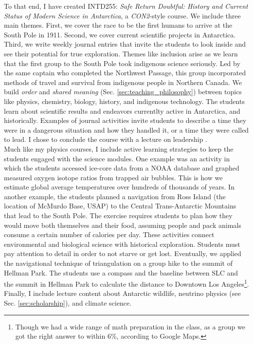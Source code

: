 \documentclass[../../../main.tex]{subfiles}
\begin{document}
To that end, I have created INTD255: \textit{Safe Return Doubtful: History and Current Status of Modern Science in Antarctica}, a \textit{CON2}-style course.  We include three main themes. First, we cover the race to be the first humans to arrive at the South Pole in 1911.  Second, we cover current scientific projects in Antarctica.  Third, we write weekly journal entries that invite the students to look inside and see their potential for true exploration.  Themes like inclusion arise as we learn that the first group to the South Pole took indigenous science seriously.  Led by the same captain who completed the Northwest Passage, this group incorporated methods of travel and survival from indigenous people in Northern Canada.  We build \textit{order} and \textit{shared meaning} (Sec. \ref{sec:teaching_philosophy}) between topics like physics, chemistry, biology, history, and indigenous technology.  The students learn about scientific results and endeavors currentlty active in Antarctica, and historically.  Examples of journal activities invite students to describe a time they were in a dangerous situation and how they handled it, or a time they were called to lead.  I chose to conclude the course with a lecture on leadership \cite{west_point}.
\\
\vspace{0.25cm}
Much like my physics courses, I include active learning strategies to keep the students engaged with the science modules.  One example was an activity in which the students accessed ice-core data from a NOAA database and graphed measured oxygen isotope ratios from trapped air bubbles.  This is how we estimate global average temperatures over hundreds of thousands of years.  In another example, the students planned a navigation from Ross Island (the location of McMurdo Base, USAP) to the Central Trans-Antarctic Mountains that lead to the South Pole.  The exercise requires students to plan how they would move both themselves and their food, assuming people and pack animals consume a certain number of calories per day.  These activities connect environmental and biological science with historical exploration.  Students must pay attention to detail in order to not starve or get lost.  Eventually, we applied the navigational technique of triangulation on a group hike to the summit of Hellman Park.  The students use a compass and the baseline between SLC and the summit in Hellman Park to calculate the distance to Downtown Los Angeles\footnote{Though we had a wide range of math preparation in the class, as a group we got the right answer to within 6\%, according to Google Maps.}.  Finally, I include lecture content about Antarctic wildlife, neutrino physics (see Sec. \ref{sec:scholarship}), and climate science.
\end{document}
